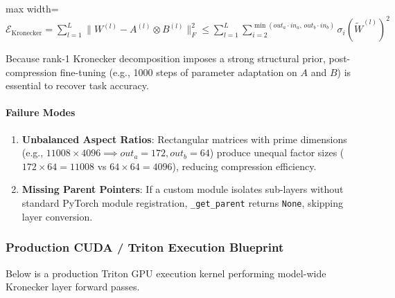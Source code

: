 \begin{center}
\begin{adjustbox}{max width=\columnwidth}
$\displaystyle
\mathcal{E}_{\text{Kronecker}} = \sum_{l=1}^{L} \|W^{(l)} - A^{(l)} \otimes B^{(l)}\|_F^2 \le \sum_{l=1}^{L} \sum_{i=2}^{\min(out_a \cdot in_a, \, out_b \cdot in_b)} \sigma_i(\widetilde{W}^{(l)})^2
$
\end{adjustbox}
\end{center}

Because rank-1 Kronecker decomposition imposes a strong structural prior, post-compression fine-tuning (e.g., 1000 steps of parameter adaptation on $A$ and $B$) is essential to recover task accuracy.

\paragraph{Failure Modes}
\begin{enumerate}
\item \textbf{Unbalanced Aspect Ratios}: Rectangular matrices with prime dimensions (e.g., $11008 \times 4096 \implies out_a=172, out_b=64$) produce unequal factor sizes ($172 \times 64 = 11008$ vs $64 \times 64 = 4096$), reducing compression efficiency.
\item \textbf{Missing Parent Pointers}: If a custom module isolates sub-layers without standard PyTorch module registration, \texttt{\_get\_parent} returns \texttt{None}, skipping layer conversion.


\end{enumerate}
\subsubsection*{Production CUDA / Triton Execution Blueprint}

Below is a production Triton GPU execution kernel performing model-wide Kronecker layer forward passes.

